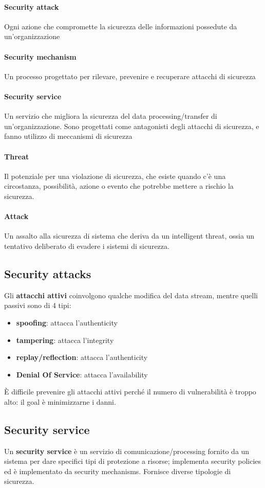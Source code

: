 \documentclass[11pt]{article}
\begin{document}
\paragraph{Security attack} Ogni azione che compromette la sicurezza delle informazioni possedute da un'organizzazione
\paragraph{Security mechanism} Un processo progettato per rilevare, prevenire e recuperare attacchi di sicurezza
\paragraph{Security service} Un servizio che migliora la sicurezza del data processing/transfer di un'organizzazione. Sono progettati come antagonisti degli attacchi di sicurezza, e fanno utilizzo di meccanismi di sicurezza
\paragraph{Threat} Il potenziale per una violazione di sicurezza, che esiste quando c'è una circostanza, possibilità, azione o evento che potrebbe mettere a rischio la sicurezza.
\paragraph{Attack} Un assalto alla sicurezza di sistema che deriva da un intelligent threat, ossia un tentativo deliberato di evadere i sistemi di sicurezza.
\subsection{Security attacks}
Gli \textbf{attacchi attivi} coinvolgono qualche modifica del data stream, mentre quelli passivi sono di 4 tipi:
\begin{itemize}
    \item \textbf{spoofing}: attacca l'authenticity
    \item \textbf{tampering}: attacca l'integrity 
    \item \textbf{replay/reflection}: attacca l'authenticity
    \item \textbf{Denial Of Service}: attacca l'availability
\end{itemize}
È difficile prevenire gli attacchi attivi perché il numero di vulnerabilità è troppo alto: il goal è minimizzarne i danni. 
\subsection{Security service}
Un \textbf{security service} è un servizio di comunicazione/processing fornito da un sistema per dare specifici tipi di protezione a risorse; implementa security policies ed è implementato da security mechanisms. Fornisce diverse tipologie di sicurezza.
\end{document}

